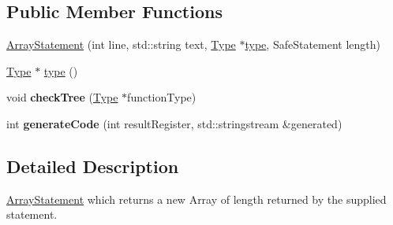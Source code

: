 \subsection*{Public Member Functions}
\begin{DoxyCompactItemize}
\item 
\hyperlink{class_scribble_core_1_1_array_statement_a0decfb9a7c6f44fd2715180caed7565c}{Array\-Statement} (int line, std\-::string text, \hyperlink{class_scribble_core_1_1_type}{Type} $\ast$\hyperlink{class_scribble_core_1_1_array_statement_a5b54b69993960b2dbaac9c49a25e6617}{type}, Safe\-Statement length)
\item 
\hyperlink{class_scribble_core_1_1_type}{Type} $\ast$ \hyperlink{class_scribble_core_1_1_array_statement_a5b54b69993960b2dbaac9c49a25e6617}{type} ()
\item 
\hypertarget{class_scribble_core_1_1_array_statement_a4e4ea1be352a79a9749b057e67921c52}{void {\bfseries check\-Tree} (\hyperlink{class_scribble_core_1_1_type}{Type} $\ast$function\-Type)}\label{class_scribble_core_1_1_array_statement_a4e4ea1be352a79a9749b057e67921c52}

\item 
\hypertarget{class_scribble_core_1_1_array_statement_aa5ac3da5af213e1c34092ab4a091a83e}{int {\bfseries generate\-Code} (int result\-Register, std\-::stringstream \&generated)}\label{class_scribble_core_1_1_array_statement_aa5ac3da5af213e1c34092ab4a091a83e}

\end{DoxyCompactItemize}


\subsection{Detailed Description}
\hyperlink{class_scribble_core_1_1_array_statement}{Array\-Statement} which returns a new Array of length returned by the supplied statement. 

